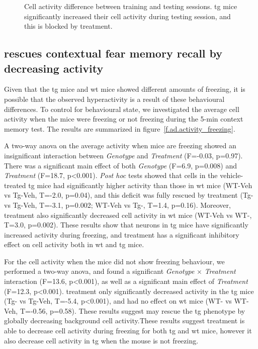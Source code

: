 \begin{figure}[h]
    
    \caption[Cell activity difference between training and memory test.]{Cell activity difference between training and testing sessions. \gls{tg} mice significantly increased their cell activity during testing session, and this is blocked by \tglu{} treatment. \label{f.ad.actdiff}}
\end{figure}


\subsection{\tglu{} rescues contextual fear memory recall by decreasing activity}

Given that the \gls{tg} mice and \gls{wt} mice showed different amounts of freezing, it is possible that the observed hyperactivity is a result of these behavioural differences. To control for behavioural state, we investigated the average cell activity when the mice were freezing or not freezing during the 5-min context memory test. The results are summarized in figure~\ref{f.ad.activity_freezing}.  

A two-way \gls{anova} on the average activity when mice are freezing showed an insignificant interaction between \textit{Genotype} and \textit{Treatment} (F=-0.03, p=0.97). There was a significant main effect of both \textit{Genotype} (F=6.9, p=0.008) and \textit{Treatment} (F=18.7, p<0.001). \textit{Post hoc} tests showed that cells in the vehicle-treated \gls{tg} mice had significantly higher activity than those in \gls{wt} mice (WT-Veh vs Tg-Veh, T=-2.0, p=0.04), and this deficit was fully rescued by \tglu{} treatment (Tg-\glu{} vs Tg-Veh, T=-3.1, p=0.002; WT-Veh vs Tg-\glu{}, T=1.4, p=0.16). Moreover, \tglu{} treatment also significantly decreased cell activity in \gls{wt} mice (WT-Veh vs WT-\glu{}, T=3.0, p=0.002). These results show that neurons in \Gls{tg} mice have significantly increased activity during freezing, and \tglu{} treatment has a significant inhibitory effect on cell activity both in \gls{wt} and \gls{tg} mice. 

For the cell activity when the mice did not show freezing behaviour, we performed a two-way \gls{anova}, and found a significant \textit{Genotype} $\times$ \textit{Treatment} interaction (F=13.6, p<0.001), as well as a significant main effect of \textit{Treatment} (F=12.3, p<0.001). \tglu{} treatment only significantly decreased activity in the \gls{tg} mice (Tg-\glu{} vs Tg-Veh, T=-5.4, p<0.001), and had no effect on \gls{wt} mice (WT-\glu{} vs WT-Veh, T=-0.56, p=0.58). These results suggest \tglu{} may rescue the \gls{tg} phenotype by globally decreasing background cell activity.These results suggest \tglu{} treatment is able to decrease cell activity during freezing for both \gls{tg} and \gls{wt} mice, however it also decrease cell activity in \gls{tg} when the mouse is not freezing.


